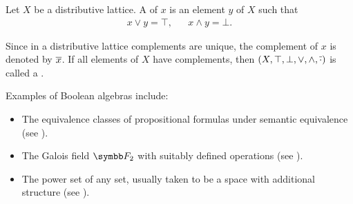 \begin{definition}\label{def:boolean_algebra}\cite{nLab:boolean_algebra}
  Let \( X \) be a distributive lattice. A  of \( x \) is an element \( y \) of \( X \) such that
  \begin{align*}
    x \vee y = \top, && x \wedge y = \bot.
  \end{align*}

  Since in a distributive lattice complements are unique, the complement of \( x \) is denoted by \( \overline{x} \). If all elements of \( X \) have complements, then \( (X, \top, \bot, \vee, \wedge, \overline{\cdot}) \) is called a .
\end{definition}

\begin{example}\label{ex:boolean_algebras}
  Examples of Boolean algebras include:

  \begin{itemize}
    \item The equivalence classes of propositional formulas under semantic equivalence (see ).
    \item The Galois field \( \BF_2 \) with suitably defined operations (see ).
    \item The power set of any set, usually taken to be a space with additional structure (see ).
  \end{itemize}
\end{example}

